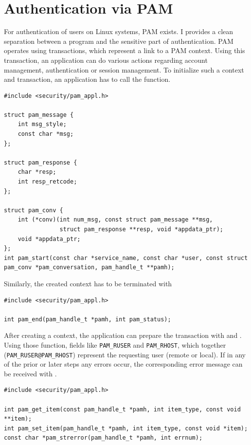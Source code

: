 \documentclass[10pt,a4paper,titlepage,twoside,english,final]{zhawreprt}
\begin{document}
\section{Authentication via PAM}\label{sec:DesignAuthViaPAM}
For authentication of users on Linux systems, \gls{PAM} exists. I provides a clean separation between a program and the sensitive part of authentication. \gls{PAM} operates using transactions, which represent a link to a \gls{PAM} context. Using this transaction, an application can do various actions regarding account management, authentication or session management. To initialize such a context and transaction, an application has to call the \cite{pam_start} function.
\setlistingC
\begin{lstlisting}[caption={Initializing a \gls{PAM} context},label=lst:InitPAMContext]
#include <security/pam_appl.h>

struct pam_message {
    int msg_style;
    const char *msg;
};

struct pam_response {
    char *resp;
    int resp_retcode;
};

struct pam_conv {
    int (*conv)(int num_msg, const struct pam_message **msg,
                struct pam_response **resp, void *appdata_ptr);
    void *appdata_ptr;
};
int pam_start(const char *service_name, const char *user, const struct pam_conv *pam_conversation, pam_handle_t **pamh);
\end{lstlisting}

Similarly, the created context has to be terminated with \cite{pam_end}
\setlistingC
\begin{lstlisting}[caption={Terminating a \gls{PAM} context},label=lst:TermPAMContext]
#include <security/pam_appl.h>

int pam_end(pam_handle_t *pamh, int pam_status);
\end{lstlisting}

After creating a context, the application can prepare the transaction with \cite{pam_set_item} and \cite{pam_get_item}. Using those function, fields like \texttt{PAM\_RUSER} and \texttt{PAM\_RHOST}, which together (\texttt{PAM\_RUSER@PAM\_RHOST}) represent the requesting user (remote or local). If in any of the prior or later steps any errors occur, the corresponding error message can be received with \cite{pam_strerror}.
\setlistingC
\begin{lstlisting}[caption={\gls{PAM} functions},label=lst:PAMFunctions]
#include <security/pam_appl.h>

int pam_get_item(const pam_handle_t *pamh, int item_type, const void **item);
int pam_set_item(pam_handle_t *pamh, int item_type, const void *item);
const char *pam_strerror(pam_handle_t *pamh, int errnum);
\end{lstlisting}
\end{document}

